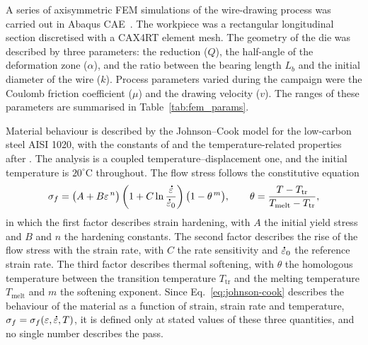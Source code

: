 \documentclass[pdflatex,sn-basic,Numbered]{sn-jnl}
\newcommand{\edot}{\accentset{\scalebox{0.4}{$\bullet$}}{\varepsilon}}
\begin{document}
A series of axisymmetric FEM simulations of the wire-drawing process was carried out in Abaqus CAE~\citep{abaqus2022}.
The workpiece was a rectangular longitudinal section discretised with a CAX4RT element mesh. The geometry of the die was described by three parameters: the reduction ($Q$), the half-angle of the deformation zone ($\alpha$), and the ratio between the bearing length $L_b$ and the initial diameter of the wire ($k$). Process parameters varied during the campaign were the Coulomb friction coefficient ($\mu$) and the drawing velocity ($v$). The ranges of these parameters are summarised in Table~\ref{tab:fem_params}.

Material behaviour is described by the Johnson--Cook model for the low-carbon steel AISI 1020, with the constants of
\citep{10.1680/jemmr.16.00019} and the temperature-related properties after \citep{shi2006analytical}. The analysis is a coupled temperature--displacement one, and the
initial temperature is $20^\circ$C throughout. The flow stress follows the constitutive equation
\begin{equation}
\sigma_f = \bigl(A + B\varepsilon^{\,n}\bigr)
           \left(1 + C\ln\frac{\edot}{\edot_0}\right)
           \bigl(1 - \theta^{\,m}\bigr), \qquad
\theta = \frac{T - T_{\mathrm{tr}}}{T_{\mathrm{melt}} - T_{\mathrm{tr}}},
\label{eq:johnson-cook}
\end{equation}
in which the first factor describes strain hardening, with $A$ the initial yield stress and $B$
and $n$ the hardening constants. The second factor describes the rise of the flow stress with the
strain rate, with $C$ the rate sensitivity and $\edot_0$ the reference strain rate. The third
factor describes thermal softening, with $\theta$ the homologous temperature between the
transition temperature $T_{\mathrm{tr}}$ and the melting temperature $T_{\mathrm{melt}}$ and $m$
the softening exponent. Since Eq.~\eqref{eq:johnson-cook} describes the behaviour of the material
as a function of strain, strain rate and temperature, $\sigma_f = \sigma_f(\varepsilon,\edot,T)$,
it is defined only at stated values of these three quantities, and no single number describes
the pass.
\end{document}
